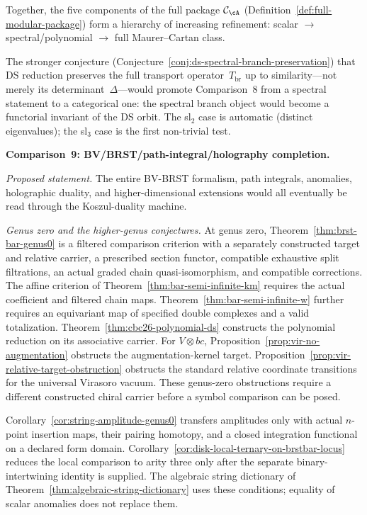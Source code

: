 Together, the five components of the full package
$\mathcal{C}_{\cA}$
(Definition~\ref{def:full-modular-package}) form a hierarchy
of increasing refinement: scalar $\to$ spectral/polynomial
$\to$ full Maurer--Cartan class.

The stronger conjecture
(Conjecture~\ref{conj:ds-spectral-branch-preservation}) that
DS reduction preserves the full transport operator~$T_{\mathrm{br}}$
up to similarity---not merely its determinant~$\Delta$---would
promote Comparison~8 from a spectral statement to a categorical one:
the spectral branch object would become a functorial invariant of
the DS orbit.  The sl${}_2$ case is automatic (distinct eigenvalues);
the sl${}_3$ case is the first non-trivial test.

\medskip

\noindent\textbf{Comparison~9: BV/BRST/path-integral/holography
completion.}

\emph{Proposed statement.}
The entire BV-BRST formalism, path integrals, anomalies,
holographic duality, and higher-dimensional extensions would all
eventually be read through the Koszul-duality machine.

\emph{Genus zero and the higher-genus conjectures.}
At genus zero, Theorem~\ref{thm:brst-bar-genus0} is a filtered comparison criterion with a separately constructed target and relative carrier, a prescribed section functor, compatible exhaustive split filtrations, an actual graded chain quasi-isomorphism, and compatible corrections.
The affine criterion of Theorem~\ref{thm:bar-semi-infinite-km} requires the actual coefficient and filtered chain maps.
Theorem~\ref{thm:bar-semi-infinite-w} further requires an equivariant map of specified double complexes and a valid totalization.
Theorem~\ref{thm:cbc26-polynomial-ds} constructs the polynomial reduction on its associative carrier.
For $V\otimes bc$, Proposition~\ref{prop:vir-no-augmentation} obstructs the augmentation-kernel target.
Proposition~\ref{prop:vir-relative-target-obstruction} obstructs the standard relative coordinate transitions for the universal Virasoro vacuum.
These genus-zero obstructions require a different constructed chiral carrier before a symbol comparison can be posed.

Corollary~\ref{cor:string-amplitude-genus0} transfers amplitudes only with actual $n$-point insertion maps, their pairing homotopy, and a closed integration functional on a declared form domain.
Corollary~\ref{cor:disk-local-ternary-on-brstbar-locus} reduces the local comparison to arity three only after the separate binary-intertwining identity is supplied.
The algebraic string dictionary of Theorem~\ref{thm:algebraic-string-dictionary} uses these conditions; equality of scalar anomalies does not replace them.

